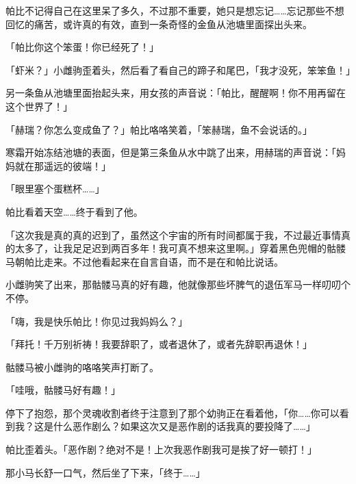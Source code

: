帕比不记得自己在这里呆了多久，不过那不重要，她只是想忘记……忘记那些不想回忆的痛苦，或许真的有效，直到一条奇怪的金鱼从池塘里面探出头来。

「帕比你这个笨蛋！你已经死了！」

「虾米？」小雌驹歪着头，然后看了看自己的蹄子和尾巴，「我才没死，笨笨鱼！」

另一条鱼从池塘里面抬起头来，用女孩的声音说：「帕比，醒醒啊！你不用再留在这个世界了！」

「赫瑞？你怎么变成鱼了？」帕比咯咯笑着，「笨赫瑞，鱼不会说话的。」

寒霜开始冻结池塘的表面，但是第三条鱼从水中跳了出来，用赫瑞的声音说：「妈妈就在那遥远的彼端！」









「眼里塞个蛋糕杯……」

帕比看着天空……终于看到了他。

「这次我是真的真的迟到了，虽然这个宇宙的所有时间都属于我，不过最近事情真的太多了，让我足足迟到两百多年！我可真不想来这里啊。」穿着黑色兜帽的骷髅马朝帕比走来。不过他看起来在自言自语，而不是在和帕比说话。

小雌驹笑了出来，那骷髅马真的好有趣，他就像那些坏脾气的退伍军马一样叨叨个不停。

「嗨，我是快乐帕比！你见过我妈妈么？」

「拜托！千万别祈祷！我要辞职了，或者退休了，或者先辞职再退休！」

骷髅马被小雌驹的咯咯笑声打断了。

「哇哦，骷髅马好有趣！」

停下了抱怨，那个灵魂收割者终于注意到了那个幼驹正在看着他，「你……你可以看到我？这是什么恶作剧么？如果这次又是恶作剧的话我真的要投降了……」

帕比歪着头。「恶作剧？绝对不是！上次我恶作剧我可是挨了好一顿打！」

那小马长舒一口气，然后坐了下来，「终于……」


